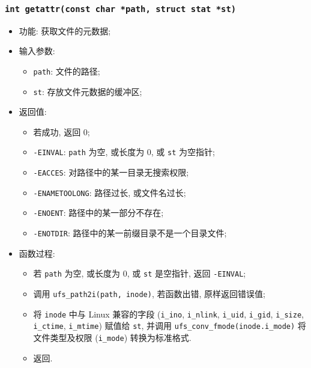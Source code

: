 \documentclass[nofonts]{ctexart}
\begin{document}
  \subsubsection[\texttt{getattr}]{\texttt{int getattr(const char *path, struct stat *st)}}
  \begin{itemize}
\item
  功能: 获取文件的元数据;
\item
  输入参数:

  \begin{itemize}
  \item
    \texttt{path}: 文件的路径;
  \item
    \texttt{st}: 存放文件元数据的缓冲区;
  \end{itemize}
\item
  返回值:

  \begin{itemize}
  \item
    若成功, 返回 0;
  \item
    \texttt{-EINVAL}: \texttt{path} 为空, 或长度为 0, 或 \texttt{st}
    为空指针;
  \item
    \texttt{-EACCES}: 对路径中的某一目录无搜索权限;
  \item
    \texttt{-ENAMETOOLONG}: 路径过长, 或文件名过长;
  \item
    \texttt{-ENOENT}: 路径中的某一部分不存在;
  \item
    \texttt{-ENOTDIR}: 路径中的某一前缀目录不是一个目录文件;
  \end{itemize}
\item
  函数过程:

  \begin{itemize}
  \item
    若 \texttt{path} 为空, 或长度为 0, 或 \texttt{st} 是空指针, 返回
    \texttt{-EINVAL};
  \item
    调用 \texttt{ufs\_path2i(path, inode)}, 若函数出错, 原样返回错误值;
  \item
    将 \texttt{inode} 中与 Linux 兼容的字段 (\texttt{i\_ino},
    \texttt{i\_nlink}, \texttt{i\_uid}, \texttt{i\_gid},
    \texttt{i\_size}, \texttt{i\_ctime}, \texttt{i\_mtime}) 赋值给
    \texttt{st}, 并调用 \texttt{ufs\_conv\_fmode(inode.i\_mode)} 将
    文件类型及权限 (\texttt{i\_mode}) 转换为标准格式.
  \item
    返回.
  \end{itemize}
  \end{itemize}
\end{document}
